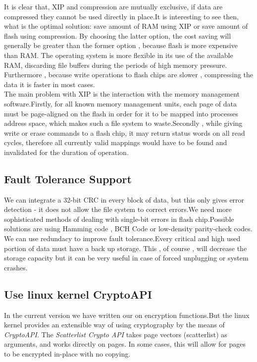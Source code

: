 \documentclass[conference]{IEEEtran}
\begin{document}
It is clear that, XIP and compression are mutually exclusive, if data are compressed they cannot be 
used directly in place.It is interesting to see then, what is the optimal solution: save amount of RAM using
XIP or save amount of flash using compression. By choosing the latter option, the cost saving will generally 
be greater than the former option , because flash is more expensive than RAM. The operating system is more 
flexible in its use of the available RAM, discarding file buffers during the periods of high memory pressure.
Furthermore , because write operations to flash chips are slower , compressing the  data it is faster in most 
cases.\\

The main problem with XIP is the interaction with the memory management software.Firstly, for all known memory 
management units, each page of data must be page-aligned on the flash in order for it to be mapped into 
processes address space, which makes such a file system to waste.Secondly , while giving write or erase 
commands to a flash chip, it may return status words on all read cycles, therefore all currently valid mappings
would have to be found and invalidated for the duration of operation.

\subsection{Fault Tolerance Support}
We can integrate a 32-bit CRC in every block of data, but this only gives error detection - it does not
allow the file system to correct errors.We need more sophisticated methods of dealing with single-bit errors
in flash chip.Possible solutions are using Hamming code , BCH Code or low-density parity-check codes.\\

We can use redundacy to improve fault tolerance.Every critical and high used portion of data must have 
a back up storage. This , of course , will decrease the storage capacity but it can be very useful in 
case of forced unplugging or system crashes.

\subsection{Use linux kernel CryptoAPI}
In the current version we have written our on encryption functions.But the linux kernel provides	 
an extensible way of using cryptography by the means of {\em CryptoAPI}. The {\em Scatterlist Crypto API}
takes page vectors (scatterlist) as arguments, and works directly on pages. In some cases, this will allow for 
pages to be encrypted in-place with no copying. \\
\end{document}
